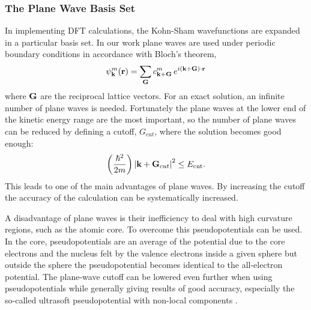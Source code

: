 \subsubsection{The Plane Wave Basis Set}
In implementing DFT calculations, the Kohn-Sham wavefunctions are expanded in a particular basis set. In our work plane waves are used under periodic boundary conditions in accordance with Bloch's theorem,
\begin{equation}
\label{eq:blochsTherom}
 \psi_{\mathrm{\mathbf{\bm{k}}}}^{m}({\mathrm{\mathbf{\bm{r}}}}) = \sum_{\mathrm{\mathbf{\bm{G}}}}c_{{\mathrm{\mathbf{\bm{k}}}} + {\mathrm{\mathbf{\bm{G}}}}}^m\, e^{i({\mathrm{\mathbf{\bm{k}}}}+{\mathrm{\mathbf{\bm{G}}}})\cdot{\ensuremath{\mathrm{\mathbf{\bm{r}}}}}}
\end{equation}
where ${\mathrm{\mathbf{\bm{G}}}}$ are the reciprocal lattice vectors. %
For an exact solution, an infinite number of plane waves is needed. Fortunately the plane waves at the lower end of the kinetic energy range are the most important, so the number of plane waves can be reduced by defining a cutoff, $G_{cut}$, where the solution becomes good enough:
\begin{equation}
 \left( \frac{\hbar^2}{2m} \right) \left| {\mathrm{\mathbf{\bm{k}}}} + {\mathrm{\mathbf{\bm{G}}}}_{cut} \right|^2 \le E_\mathrm{cut}.
\end{equation}
This leads to one of the main advantages of plane waves. By increasing the cutoff the accuracy of the calculation can be systematically increased. 

A disadvantage of plane waves is their inefficiency to deal with high curvature regions, such as the atomic core. To overcome this pseudopotentials can be used. In the core, pseudopotentials are an average of the potential due to the core electrons and the nucleus felt by the valence electrons inside a given sphere but outside the sphere the pseudopotential becomes identical to the all-electron potential. The plane-wave cutoff can be lowered even further when using pseudopotentials while generally giving results of good accuracy, especially the so-called ultrasoft pseudopotential with non-local components \cite{vanderbilt1990}.
